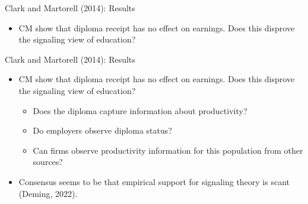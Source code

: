 \documentclass[blue]{beamer}
\begin{document}
{{{ 

\begin{frame}{Clark and Martorell (2014): Results}

\begin{itemize}
\item CM show that diploma receipt has no effect on earnings. Does this
disprove the signaling view of education?
\end{itemize}
\end{frame}

\begin{frame}{Clark and Martorell (2014): Results}

\begin{itemize}
\item CM show that diploma receipt has no effect on earnings. Does this
disprove the signaling view of education?{\small{}\medskip{}
}

\begin{itemize}
\item Does the diploma capture information about productivity?{\small{}\medskip{}
}{\small \par}
\item Do employers observe diploma status?{\small{}\medskip{}
}{\small \par}
\item Can firms observe productivity information for this population from
other sources?
\end{itemize}
\medskip
\item Consensus seems to be that empirical support for signaling theory is scant (Deming, 2022). 
\end{itemize}
\end{frame}

}}}
\end{document}
